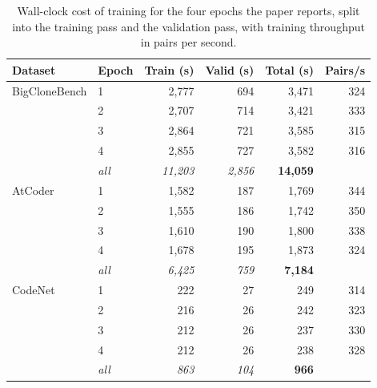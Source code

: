 \begin{table}[!htbp]
\centering
\caption{Wall-clock cost of training \method{} for the four epochs the paper reports, split into the training pass and the validation pass, with training throughput in pairs per second.}
\label{tab:d5_epochs}

\scriptsize
\setlength{\tabcolsep}{4.6pt}
\renewcommand{\arraystretch}{1.08}

\begin{tabular}{@{}llrrrr@{}}
\toprule
\textbf{Dataset} & \textbf{Epoch} & \textbf{Train (s)} & \textbf{Valid (s)} & \textbf{Total (s)} & \textbf{Pairs/s} \\
\midrule

BigCloneBench & 1 & 2,777 & 694 & 3,471 & 324 \\
 & 2 & 2,707 & 714 & 3,421 & 333 \\
 & 3 & 2,864 & 721 & 3,585 & 315 \\
 & 4 & 2,855 & 727 & 3,582 & 316 \\
 & \textit{all} & \textit{11,203} & \textit{2,856} & \textbf{14,059} & \\

\midrule
AtCoder & 1 & 1,582 & 187 & 1,769 & 344 \\
 & 2 & 1,555 & 186 & 1,742 & 350 \\
 & 3 & 1,610 & 190 & 1,800 & 338 \\
 & 4 & 1,678 & 195 & 1,873 & 324 \\
 & \textit{all} & \textit{6,425} & \textit{759} & \textbf{7,184} & \\

\midrule
CodeNet & 1 & 222 & 27 & 249 & 314 \\
 & 2 & 216 & 26 & 242 & 323 \\
 & 3 & 212 & 26 & 237 & 330 \\
 & 4 & 212 & 26 & 238 & 328 \\
 & \textit{all} & \textit{863} & \textit{104} & \textbf{966} & \\

\bottomrule
\end{tabular}
\end{table}
